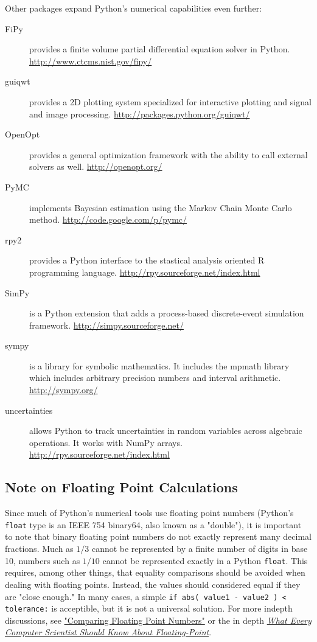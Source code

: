 \documentclass{report}
\begin{document}
Other packages expand Python's numerical capabilities even further:

\begin{description}
	\item[FiPy] provides a finite volume partial differential equation solver in Python. \url{http://www.ctcms.nist.gov/fipy/}
	\item[guiqwt] provides a 2D plotting system specialized for interactive plotting and signal and image processing. \url{http://packages.python.org/guiqwt/}
	\item[OpenOpt] provides a general optimization framework with the ability to call external solvers as well. \url{http://openopt.org/}
	\item[PyMC] implements Bayesian estimation using the Markov Chain Monte Carlo method. \url{http://code.google.com/p/pymc/}
	\item[rpy2] provides a Python interface to the stastical analysis oriented R programming language. \url{http://rpy.sourceforge.net/index.html}
	\item[SimPy] is a Python extension that adds a process-based discrete-event simulation framework. \url{http://simpy.sourceforge.net/}
	\item[sympy] is a library for symbolic mathematics. It includes the mpmath library which includes arbitrary precision numbers and interval arithmetic. \url{http://sympy.org/}
	\item[uncertainties] allows Python to track uncertainties in random variables across algebraic operations. It works with NumPy arrays. \url{http://rpy.sourceforge.net/index.html}
\end{description}


\subsection*{Note on Floating Point Calculations}
Since much of Python's numerical tools use floating point numbers (Python's \verb|float| type is an IEEE 754 binary64, also known as a "double"), it is important to note that binary floating point numbers do not exactly represent many decimal fractions. Much as $1/3$ cannot be represented by a finite number of digits in base 10, numbers such as $1/10$ cannot be represented exactly in a Python \verb|float|. This requires, among other things, that equality comparisons should be avoided when dealing with floating points. Instead, the values should considered equal if they are "close enough." In many cases, a simple \verb|if abs( value1 - value2 ) < tolerance:| is acceptible, but it is not a universal solution. For more indepth discussions, see \href{http://www.cygnus-software.com/papers/comparingfloats/comparingfloats.htm}{"Comparing Floating Point Numbers"}  or the in depth \href{http://www.cse.msu.edu/~cse320/Documents/FloatingPoint.pdf}{\emph{What Every Computer Scientist Should Know About Floating-Point}}.
\end{document}
